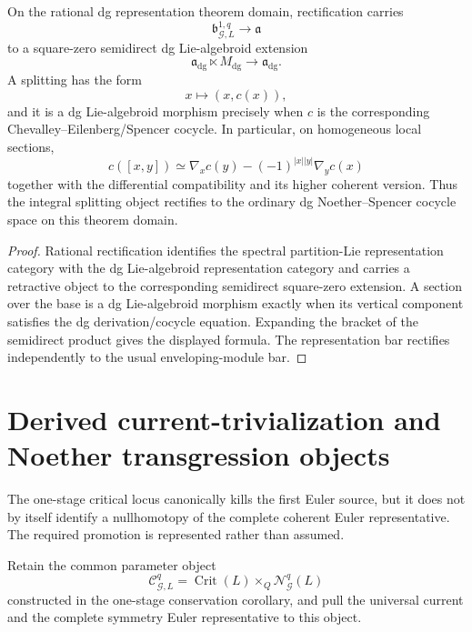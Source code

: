 \begin{theorem}
\label{thm:symmetry-noether-rational-dg-cocycle-interpretation}
On the rational dg representation theorem domain, rectification carries
\[
\mathfrak b_{\mathcal G,L}^{1,q}\longrightarrow\mathfrak a
\]
to a square-zero semidirect dg Lie-algebroid extension
\[
\mathfrak a_{\mathrm{dg}}\ltimes M_{\mathrm{dg}}
\longrightarrow
\mathfrak a_{\mathrm{dg}}.
\]
A splitting has the form
\[
x\longmapsto (x,c(x)),
\]
and it is a dg Lie-algebroid morphism precisely when $c$ is the corresponding
Chevalley--Eilenberg/Spencer cocycle.  In particular, on homogeneous local
sections,
\[
c([x,y])
\simeq
\nabla_xc(y)
-
(-1)^{|x||y|}
\nabla_yc(x)
\]
together with the differential compatibility and its higher coherent version.
Thus the integral splitting object rectifies to the ordinary dg
Noether--Spencer cocycle space on this theorem domain.
\end{theorem}

\begin{proof}
Rational rectification identifies the spectral partition-Lie representation
category with the dg Lie-algebroid representation category and carries a
retractive object to the corresponding semidirect square-zero extension.
A section over the base is a dg Lie-algebroid morphism exactly when its vertical
component satisfies the dg derivation/cocycle equation.  Expanding the bracket of
the semidirect product gives the displayed formula.  The representation bar
rectifies independently to the usual enveloping-module bar.
\end{proof}

\section{Derived current-trivialization and Noether transgression objects}
\label{sec:symmetry-noether-derived-current-trivialization-and-noether-transgression-objects}

The one-stage critical locus canonically kills the first Euler source, but it does
not by itself identify a nullhomotopy of the complete coherent Euler representative.
The required promotion is represented rather than assumed.

Retain the common parameter object
\[
\mathcal C_{\mathcal G,L}^{q}
=
\operatorname{Crit}(L)
\times_Q
\mathcal N_{\mathcal G}^{q}(L)
\]
constructed in the one-stage conservation corollary, and pull the universal current
and the complete symmetry Euler representative to this object.

